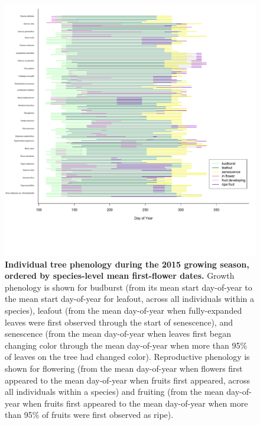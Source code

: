 \documentclass{article}
\begin{document}
\begin{figure}[h]
  \centering
  \includegraphics{../analyses/figures/grosea_repsort_ripefruit_ind_legend.pdf}
  \caption{\textbf{Individual tree phenology during the 2015 growing season, ordered by species-level mean first-flower dates.} Growth phenology is shown for budburst (from its mean start day-of-year to the mean start day-of-year for leafout, across all individuals within a species), leafout (from the mean day-of-year when fully-expanded leaves were first observed through the start of senescence), and senescence (from the mean day-of-year when leaves first began changing color through the mean day-of-year when more than 95\% of leaves on the tree had changed color). Reproductive phenology is shown for flowering (from the mean day-of-year when flowers first appeared to the mean day-of-year when fruits first appeared, across all individuals within a species) and fruiting (from the mean day-of-year when fruits first appeared to the mean day-of-year when more than 95\% of fruits were first observed as ripe).}
 \label{fig:focind}
\end{figure}
  
\end{document}

